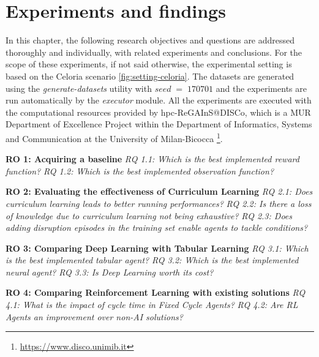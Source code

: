 \chapter{Experiments and findings}

In this chapter, the following research objectives and questions are addressed thoroughly and individually, with related experiments and conclusions.
For the scope of these experiments, if not said otherwise, the experimental setting is based on the Celoria scenario \ref{fig:setting-celoria}.
The datasets are generated using the \textit{generate-datasets} utility with $seed \; = \; 170701$ and the experiments are run automatically by the \textit{executor} module.
All the experiments are executed with the computational resources provided by hpc-ReGAInS@DISCo, which is a MUR Department of Excellence Project within the Department of Informatics, Systems and Communication at the University of Milan-Bicocca \footnote{\href{https://www.disco.unimib.it}{https://www.disco.unimib.it}}.

\hfill \break
\noindent
\textbf{\hypertarget{ro1}{RO 1}: Acquiring a baseline}
\hfill \break
\textit{\hypertarget{rq1.1}{RQ 1.1}: Which is the best implemented reward function?}
\hfill \break
\textit{\hypertarget{rq1.2}{RQ 1.2}: Which is the best implemented observation function?}

\hfill \break
\noindent
\textbf{\hypertarget{ro2}{RO 2}: Evaluating the effectiveness of Curriculum Learning}
\hfill \break
\textit{\hypertarget{rq2.1}{RQ 2.1}: Does curriculum learning leads to better running performances?}
\hfill \break
\textit{\hypertarget{rq2.2}{RQ 2.2}: Is there a loss of knowledge due to curriculum learning not being exhaustive?}
\hfill \break
\textit{\hypertarget{rq2.3}{RQ 2.3}: Does adding disruption episodes in the training set enable agents to tackle conditions?}

\hfill \break
\noindent
\textbf{\hypertarget{ro3}{RO 3}: Comparing Deep Learning with Tabular Learning}
\hfill \break
\textit{\hypertarget{rq3.1}{RQ 3.1}: Which is the best implemented tabular agent?}
\hfill \break
\textit{\hypertarget{rq3.2}{RQ 3.2}: Which is the best implemented neural agent?}
\hfill \break
\textit{\hypertarget{rq3.3}{RQ 3.3}: Is Deep Learning worth its cost?}

\hfill \break
\noindent
\textbf{\hypertarget{ro4}{RO 4}: Comparing Reinforcement Learning with existing solutions}
\hfill \break
\textit{\hypertarget{rq4.1}{RQ 4.1}: What is the impact of cycle time in Fixed Cycle Agents?}
\hfill \break
\textit{\hypertarget{rq4.2}{RQ 4.2}: Are RL Agents an improvement over non-AI solutions?}


